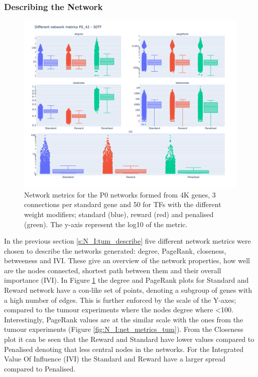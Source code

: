 \subsubsection{Describing the Network}


\begin{figure}[!htb]    
    \centering
    \includegraphics[width=1.0\textwidth,height=0.7\textheight,keepaspectratio]{Sections/Network_I/Resources/P0/P0_NetworkMetricsComp_50TF_2.png}
    \caption{Network metrics for the P0 networks formed from 4K genes, 3 connections per standard gene and 50 for TFs with the different weight modifiers; standard (blue), reward (red) and penalised (green). The y-axis represent the log10 of the metric. }
    \label{fig:N_I:net_metrics_p0}
\end{figure}

In the previous section \ref{s:N_I:tum_describe} five different network metrics were chosen to describe the networks generated: degree, PageRank, closeness, betweeness and IVI. These give an overview of the network properties, how well are the nodes connected, shortest path between them and their overall importance (IVI). In Figure \ref{fig:N_I:net_metrics_p0} the degree and PageRank plots for Standard and Reward network have a con-like set of points, denoting a subgroup of genes with a high number of edges. This is further enforced by the scale of the Y-axes; compared to the tumour experiments where the nodes degree where <100. Interestingly, PageRank values are at the similar scale with the ones from the tumour experiments (Figure \ref{fig:N_I:net_metrics_tum}). From the Closeness plot it can be seen that the Reward and Standard have lower values compared to Penalised denoting that less central nodes in the networks. For the Integrated Value Of Influence (IVI) the Standard and Reward have a larger spread compared to Penalised. 

